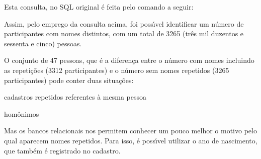 \documentclass[
12pt,		%
openright,	%
twoside,  %
a4paper,			%
chapter=TITLE,		%
english,			%
french,				%
spanish,			%
brazil				%
]{USPSC-classe/USPSC}
\begin{document}
Esta consulta, no SQL original \'e feita pelo comando a seguir:















\noindent\begin{center}\mbox{\centering{}}\end{center}

















Assim, pelo emprego da consulta acima, foi poss\'{\i}vel identificar um n\'umero de participantes com nomes distintos, com um total de 3265 (tr\^es mil duzentos e sessenta e cinco) pessoas.














O conjunto de 47 pessoas, que \'e a diferen\c{c}a entre o n\'umero com nomes incluindo as repeti\c{c}\~oes (3312 participantes) e o n\'umero sem nomes repetidos (3265 participantes) pode conter duas situa\c{c}\~oes:















\begin{alineas}
\item cadastros repetidos referentes \`a mesma pessoa
\item hom\^onimos
\end{alineas}

Mas os bancos relacionais nos permitem conhecer um pouco melhor o motivo pelo qual aparecem nomes repetidos. Para isso, \'e poss\'{\i}vel utilizar o ano de nascimento, que tamb\'em \'e registrado no cadastro.
\end{document}
